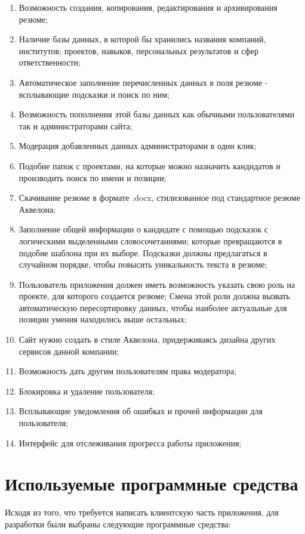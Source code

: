 \documentclass[a4paper,12pt]{diplom}
\begin{document}
\begin{enumerate}
  \item Возможность создания, копирования, редактирования и архивирования резюме;
	\item Наличие базы данных, в которой бы хранились названия компаний, институтов;
	проектов, навыков, персональных результатов и сфер ответственности;
	\item Автоматическое заполнение перечисленных данных в поля резюме - всплывающие подсказки и поиск по ним;
	\item Возможность пополнения этой базы данных как обычными пользователями так и администраторами сайта;
	\item Модерация добавленных данных администраторами в один клик;
	\item Подобие папок с проектами, на которые можно назначить кандидатов и производить поиск по имени и позиции;
	\item Скачивание резюме в формате .docx, стилизованное под стандартное резюме Аквелона;
	\item Заполнение общей информации о кандидате с помощью подсказок с логическими выделенными словосочетаниями;
	 которые превращаются в подобие шаблона при их выборе. Подсказки должны предлагаться в случайном порядке, чтобы повысить уникальность текста в резюме;
	\item Пользователь приложения должен иметь возможность указать свою роль на проекте, для которого создается резюме;
	 Смена этой роли должна вызвать автоматическую пересортировку данных, 
	 чтобы наиболее актуальные для позиции умения находились выше остальных;
	 \item Сайт нужно создать в стиле Аквелона, придерживаясь дизайна других сервисов данной 
	 компании;
	 \item Возможность дать другим пользователям права модератора;
	 \item Блокировка и удаление пользователя;
	 \item Всплывающие уведомления об ошибках и прочей информации для пользователя;
	 \item Интерфейс для отслеживания прогресса работы приложения;
\end{enumerate}

\section{Используемые программные средства}

Исходя из того, что требуется написать клиентскую часть приложения, для разработки были выбраны следующие программные средства:
\end{document}
